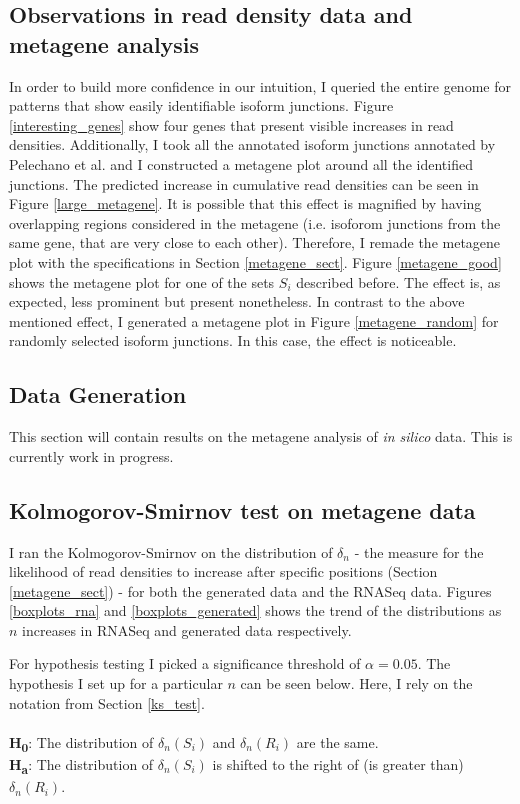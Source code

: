 \documentclass[12pt]{article}
\begin{document}
\subsection{Observations in read density data and metagene analysis}
In order to build more confidence in our intuition, I queried the entire genome for patterns that show easily identifiable isoform junctions. Figure \ref{interesting_genes} show four genes that present visible increases in read densities. 
Additionally, I took all the annotated isoform junctions annotated by Pelechano et al. \cite{Pelechano2013} and I constructed a metagene plot around all the identified junctions. The predicted increase in cumulative read densities can be seen in Figure \ref{large_metagene}. 
It is possible that this effect is magnified by having overlapping regions considered in the metagene (i.e. isoforom junctions from the same gene, that are very close to each other). Therefore, I remade the metagene plot with the specifications in Section \ref{metagene_sect}. Figure \ref{metagene_good} shows the metagene plot for one of the sets $S_i$ described before. The effect is, as expected, less prominent but present nonetheless. 
In contrast to the above mentioned effect, I generated a metagene plot in Figure \ref{metagene_random} for randomly selected isoform junctions. In this case, the effect is noticeable. 


\subsection{Data Generation}
This section will contain results on the metagene analysis of \textit{in silico} data. This is currently work in progress.

\subsection{Kolmogorov-Smirnov test on metagene data}

I ran the Kolmogorov-Smirnov on the distribution of $\delta_n$ - the measure for the likelihood of read densities to increase after specific positions (Section \ref{metagene_sect}) - for both the generated data and the RNASeq data. Figures \ref{boxplots_rna} and \ref{boxplots_generated} shows the trend of the distributions as $n$ increases in RNASeq and generated data respectively. 


For hypothesis testing I picked a significance threshold of $\alpha = 0.05$. The hypothesis I set up for a particular $n$ can be seen below. Here, I rely on the notation from Section \ref{ks_test}. \\
\\
\textbf{H\textsubscript{0}}: The distribution of $\delta_n(S_i)$ and $\delta_n(R_i)$ are the same. \\ 
\textbf{H\textsubscript{a}}: The distribution of $\delta_n(S_i)$ is shifted to the right of (is greater than) $\delta_n(R_i)$.\\
\end{document}
